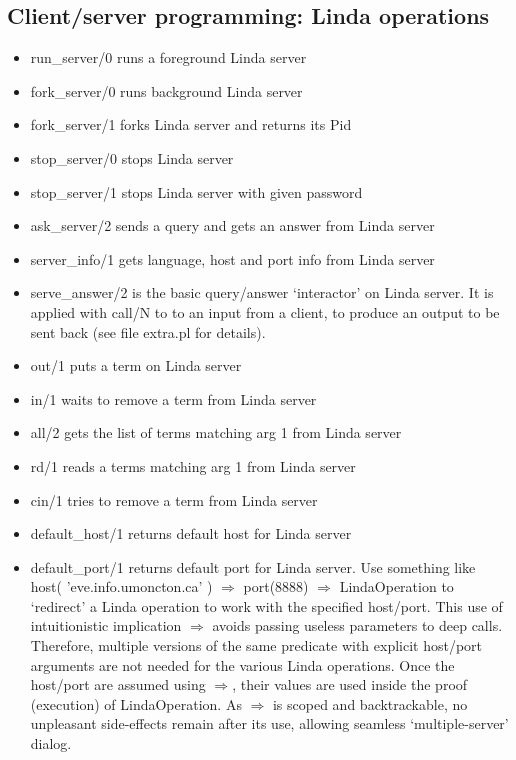 \documentclass{article}
\begin{document}
\subsection{Client/server programming: Linda operations}


\begin{itemize}

\item run\_server/0 runs a foreground Linda server

\item fork\_server/0 runs background Linda server
\item fork\_server/1 forks Linda server and returns its Pid

\item stop\_server/0 stops Linda server
\item stop\_server/1 stops Linda server with given password

\item ask\_server/2 sends a query and gets an answer from Linda server

\item server\_info/1 gets language, host and port info from Linda server
\item serve\_answer/2 is the basic query/answer `interactor' on Linda server. It is applied with call/N to to an input from a client,
to produce an output to be sent back (see file extra.pl for details).

\item out/1 puts a term on Linda server
\item in/1 waits to remove a term from Linda server
\item all/2 gets the list of terms matching arg 1 from Linda server
\item rd/1 reads a terms matching arg 1 from Linda server
\item cin/1 tries to remove a term from Linda server
\item default\_host/1 returns default host for Linda server
\item default\_port/1 returns default port for Linda server. Use
something like host( 'eve.info.umoncton.ca' ) $\Rightarrow$ port(8888) $\Rightarrow$ LindaOperation to `redirect' a Linda operation to work with the specified
host/port. This use of intuitionistic implication
$\Rightarrow$ avoids passing useless parameters
to deep calls. Therefore, multiple versions of the same
predicate with explicit host/port arguments are not needed
for the various Linda operations. Once the host/port are
assumed using $\Rightarrow$, their values are used inside
the proof (execution) of LindaOperation. As  $\Rightarrow$ is
scoped and backtrackable, no unpleasant side-effects remain
after its use, allowing seamless `multiple-server' dialog.
\end{itemize}
\end{document}
